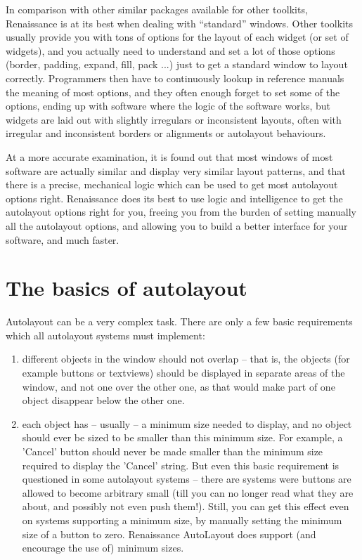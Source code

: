 In comparison with other similar packages available for other
toolkits, Renaissance is at its best when dealing with ``standard''
windows.  Other toolkits usually provide you with tons of options for
the layout of each widget (or set of widgets), and you actually need
to understand and set a lot of those options (border, padding, expand,
fill, pack ...) just to get a standard window to layout correctly.
Programmers then have to continuously lookup in reference manuals the
meaning of most options, and they often enough forget to set some of
the options, ending up with software where the logic of the software
works, but widgets are laid out with slightly irregulars or
inconsistent layouts, often with irregular and inconsistent borders or
alignments or autolayout behaviours.

At a more accurate examination, it is found out that most windows of
most software are actually similar and display very similar layout
patterns, and that there is a precise, mechanical logic which can be
used to get most autolayout options right.  Renaissance does its best to
use logic and intelligence to get the autolayout options right for
you, freeing you from the burden of setting manually all the
autolayout options, and allowing you to build a better interface for
your software, and much faster.


\section{The basics of autolayout}
Autolayout can be a very complex task.  There are only a few basic
requirements which all autolayout systems must implement:
\begin{enumerate}

\item different objects in the window should not overlap -- that is, 
the objects (for example buttons or textviews) should be displayed in
separate areas of the window, and not one over the other one, as that
would make part of one object disappear below the other one.

\item each object has -- usually -- a minimum size needed to display, 
and no object should ever be sized to be smaller than this minimum
size.  For example, a 'Cancel' button should never be made smaller
than the minimum size required to display the 'Cancel' string.  But
even this basic requirement is questioned in some autolayout systems
-- there are systems were buttons are allowed to become arbitrary
small (till you can no longer read what they are about, and possibly
not even push them!).  Still, you can get this effect even on systems
supporting a minimum size, by manually setting the minimum size of a
button to zero.  Renaissance AutoLayout does support (and encourage
the use of) minimum sizes.
\end{enumerate}

